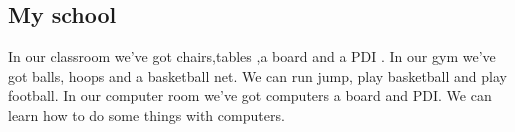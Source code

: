 %
%
\subsection*{My school}

In our classroom we’ve got chairs,tables ,a board and a PDI .
In our gym we’ve got balls, hoops and a basketball net. We can run  jump, play basketball and play football.
In our computer room we’ve got computers a board and PDI. We can learn how to do some things with computers.


